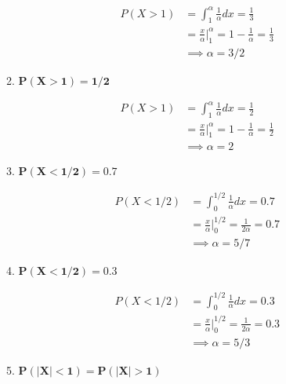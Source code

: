 \documentclass[10pt, oneside]{article}   	%
\theoremstyle{definition}
\begin{document}
\begin{enumerate}[label=4.\arabic*]
\begin{enumerate}
	\begin{align*}
	P(X > 1) &= \int^\alpha_1 \frac{1}{\alpha} dx = \frac{1}{3} \\
	&= \frac{x}{\alpha} \Big|^\alpha_1 = 1 - \frac{1}{\alpha} = \frac{1}{3} \\
	&\implies \boxed{\alpha = 3/2}
	\end{align*}
	
	\item  \begin{tcolorbox}[
	  colback=Cerulean!5!white,
	  colframe=Cerulean!75!black]
	\textbf{$\bm{P(X > 1) = 1/2}$}
	\end{tcolorbox}
	
	\begin{align*}
	P(X > 1) &= \int^\alpha_1 \frac{1}{\alpha} dx = \frac{1}{2} \\
	&= \frac{x}{\alpha} \Big|^\alpha_1 = 1 - \frac{1}{\alpha} = \frac{1}{2} \\
	&\implies \boxed{\alpha = 2}
	\end{align*}
	
	\item  \begin{tcolorbox}[
	  colback=Cerulean!5!white,
	  colframe=Cerulean!75!black]
	\textbf{$\bm{P(X < 1/2) = 0.7}$}
	\end{tcolorbox}
	
	\begin{align*}
	P(X < 1/2) &= \int^{1/2}_{0} \frac{1}{\alpha} dx = 0.7 \\
	&= \frac{x}{\alpha} \Big|^{1/2}_{0} = \frac{1}{2\alpha} = 0.7 \\
	&\implies \boxed{\alpha = 5/7}
	\end{align*}
	
	\item  \begin{tcolorbox}[
	  colback=Cerulean!5!white,
	  colframe=Cerulean!75!black]
	\textbf{$\bm{P(X < 1/2) = 0.3}$}
	\end{tcolorbox}
	
	\begin{align*}
	P(X < 1/2) &= \int^{1/2}_{0} \frac{1}{\alpha} dx = 0.3 \\
	&= \frac{x}{\alpha} \Big|^{1/2}_{0} = \frac{1}{2\alpha} = 0.3 \\
	&\implies \boxed{\alpha = 5/3}
	\end{align*}
	
	\item  \begin{tcolorbox}[
	  colback=Cerulean!5!white,
	  colframe=Cerulean!75!black]
	\textbf{$\bm{P(|X| < 1) = P(|X| > 1)}$}
	\end{tcolorbox}
	

\end{enumerate}
\end{enumerate}
\end{document}
